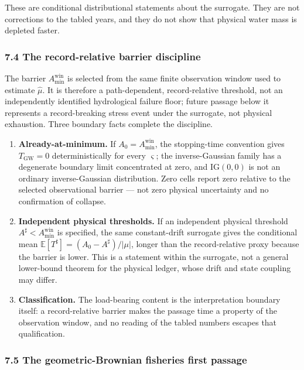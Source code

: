 \documentclass[11pt]{article}
\providecommand{\tightlist}{\setlength{\itemsep}{0pt}\setlength{\parskip}{0pt}}
\begin{document}
These are conditional distributional statements about the surrogate.
They are not corrections to the tabled years, and they do not show that
physical water mass is depleted faster.

\subsubsection{7.4 The record-relative barrier
discipline}\label{the-record-relative-barrier-discipline}

The barrier \(A_{\min}^{\mathrm{win}}\) is selected from the same finite
observation window used to estimate \(\widehat\mu\). It is therefore a
path-dependent, record-relative threshold, not an independently
identified hydrological failure floor; future passage below it
represents a record-breaking stress event under the surrogate, not
physical exhaustion. Three boundary facts complete the discipline.

\begin{enumerate}
\def\labelenumi{\arabic{enumi}.}
\tightlist
\item
  \textbf{Already-at-minimum.} If \(A_0 = A_{\min}^{\mathrm{win}}\), the
  stopping-time convention gives \(T_{\mathrm{GW}} = 0\)
  deterministically for every \(\varsigma\); the inverse-Gaussian family
  has a degenerate boundary limit concentrated at zero, and
  \(\mathrm{IG}(0,0)\) is not an ordinary inverse-Gaussian distribution.
  Zero cells report zero relative to the selected observational barrier
  --- not zero physical uncertainty and no confirmation of collapse.
\item
  \textbf{Independent physical thresholds.} If an independent physical
  threshold \(A^\sharp < A_{\min}^{\mathrm{win}}\) is specified, the
  same constant-drift surrogate gives the conditional mean
  \(\mathbb{E}[T^\sharp] = (A_0 - A^\sharp)/|\mu|\), longer than the
  record-relative proxy because the barrier is lower. This is a
  statement within the surrogate, not a general lower-bound theorem for
  the physical ledger, whose drift and state coupling may differ.
\item
  \textbf{Classification.} The load-bearing content is the
  interpretation boundary itself: a record-relative barrier makes the
  passage time a property of the observation window, and no reading of
  the tabled numbers escapes that qualification.
\end{enumerate}

\subsubsection{7.5 The geometric-Brownian fisheries first
passage}\label{the-geometric-brownian-fisheries-first-passage}
\end{document}
